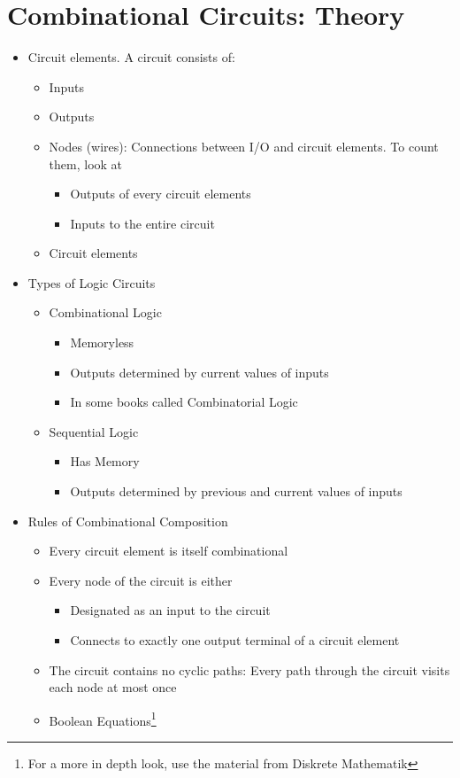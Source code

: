 \documentclass[a4paper]{article}
\begin{document}
\section{Combinational Circuits: Theory}
\begin{itemize}
\item Circuit elements. A circuit consists of:
\begin{itemize}
\item Inputs
\item Outputs
\item Nodes (wires): Connections between I/O and circuit elements. To count them, look at
\begin{itemize}
\item Outputs of every circuit elements
\item Inputs to the entire circuit
\end{itemize}
\item Circuit elements
\end{itemize}
\item Types of Logic Circuits
\begin{itemize}
\item Combinational Logic
\begin{itemize}
\item Memoryless
\item Outputs determined by current values of inputs
\item In some books called Combinatorial Logic
\end{itemize}
\item Sequential Logic
\begin{itemize}
\item Has Memory
\item Outputs determined by previous and current values of inputs
\end{itemize}
\end{itemize}
\item Rules of Combinational Composition
\begin{itemize}
\item Every circuit element is itself combinational
\item Every node of the circuit is either
\begin{itemize}
\item Designated as an input to the circuit
\item Connects to exactly one output terminal of a circuit element
\end{itemize}
\item The circuit contains no cyclic paths: Every path through the circuit visits each node at most once
\item Boolean Equations\footnote{For a more in depth look, use the material from Diskrete Mathematik}
\end{itemize}

\end{itemize}
\end{document}

